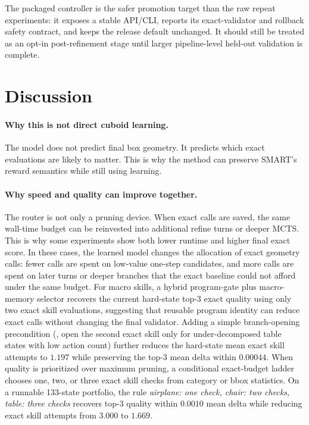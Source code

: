 \documentclass[10pt,twocolumn,letterpaper]{article}
\begin{document}
The packaged controller is the safer promotion target than the raw repeat
experiments: it exposes a stable API/CLI, reports its exact-validator and
rollback safety contract, and keeps the release default unchanged.  It should
still be treated as an opt-in post-refinement stage until larger
pipeline-level held-out validation is complete.

\section{Discussion}

\paragraph{Why this is not direct cuboid learning.}
The model does not predict final box geometry.  It predicts which exact
evaluations are likely to matter.  This is why the method can preserve SMART's
reward semantics while still using learning.

\paragraph{Why speed and quality can improve together.}
The router is not only a pruning device.  When exact calls are saved, the same
wall-time budget can be reinvested into additional refine turns or deeper MCTS.
This is why some experiments show both lower runtime and higher final exact
score.  In these cases, the learned model changes the allocation of exact
geometry calls: fewer calls are spent on low-value one-step candidates, and more
calls are spent on later turns or deeper branches that the exact baseline could
not afford under the same budget.
For macro skills, a hybrid program-gate plus macro-memory selector recovers the
current hard-state top-3 exact quality using only two exact skill evaluations,
suggesting that reusable program identity can reduce exact calls without
changing the final validator.  Adding a simple branch-opening precondition
(\eg, open the second exact skill only for under-decomposed table states with
low action count) further reduces the hard-state mean exact skill attempts to
$1.197$ while preserving the top-3 mean delta within $0.00044$.
When quality is prioritized over maximum pruning, a conditional exact-budget
ladder chooses one, two, or three exact skill checks from category or bbox
statistics.  On a runnable 133-state portfolio, the rule
\emph{airplane: one check, chair: two checks, table: three checks} recovers
top-3 quality within $0.0010$ mean delta while reducing exact skill attempts
from $3.000$ to $1.669$.
\end{document}
